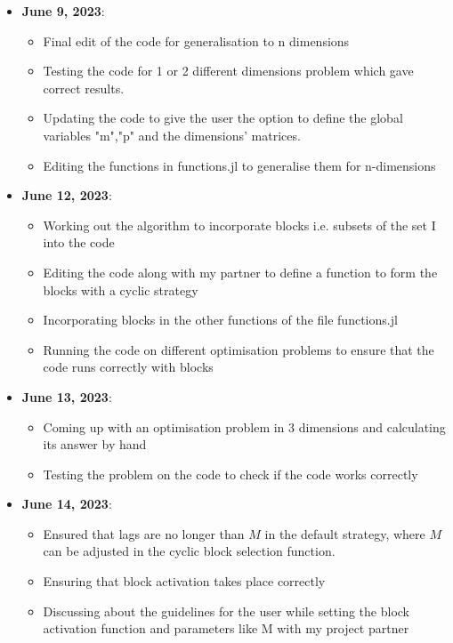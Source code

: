 \documentclass[a4paper,11pt,fleqn]{article}
\theoremstyle{plain}{\theorembodyfont{\rmfamily}%
\newtheorem{conjecture}[theorem]{Conjecture}}
\theoremstyle{plain}{\theorembodyfont{\rmfamily}%
\newtheorem{example}[theorem]{Example}}
\theoremstyle{plain}{\theorembodyfont{\rmfamily}%
\newtheorem{remark}[theorem]{Remark}}
\theoremstyle{plain}{\theorembodyfont{\rmfamily}%
\newtheorem{algorithm}[theorem]{Algorithm}}
\theoremstyle{plain}{\theorembodyfont{\rmfamily}%
\newtheorem{condition}[theorem]{Condition}}
\theoremstyle{plain}{\theorembodyfont{\rmfamily}%
\newtheorem{definition}[theorem]{Definition}}
\theoremstyle{plain}{\theorembodyfont{\rmfamily}
\newtheorem{fact}[theorem]{Fact}}
\theoremstyle{plain}{\theorembodyfont{\rmfamily}
\newtheorem{problem}[theorem]{Problem}}
\theoremstyle{plain}{\theorembodyfont{\rmfamily}
\newtheorem{notation}[theorem]{Notation}}
\theoremstyle{plain}{\theorembodyfont{\rmfamily}
\newtheorem{project}[theorem]{Project}}
\begin{document}
\begin{itemize}
\item {\bf June 9, 2023}:
\begin{itemize} 
\item Final edit of the code for generalisation to n dimensions
\item Testing the code for 1 or 2 different dimensions problem which gave correct results.
\item Updating the code to give the user the option to define the global variables "m","p" and the dimensions' matrices. 
\item Editing the functions in functions.jl to generalise them for n-dimensions
\end{itemize}

\item {\bf June 12, 2023}:
\begin{itemize} 
\item Working out the algorithm to incorporate blocks i.e. subsets of the set I into the code
\item Editing the code along with my partner to define a function to form the blocks with a cyclic strategy
\item Incorporating blocks in the other functions of the file functions.jl
\item Running the code on different optimisation problems to ensure that the code runs correctly with blocks
\end{itemize}

\item {\bf June 13, 2023}:
\begin{itemize} 
\item 
Coming up with an optimisation problem in 3 dimensions and calculating its answer by hand
\item Testing the problem on the code to check if the code works correctly
\end{itemize}

\item {\bf June 14, 2023}:
\begin{itemize} 
\item Ensured that lags are no longer than $M$ in the default strategy, where $M$ can be adjusted in the cyclic block selection function.
\item Ensuring that block activation takes place correctly
\item Discussing about the guidelines for the user while setting the block activation function and parameters like M with my project partner
\end{itemize}


\end{itemize}
\end{document}

